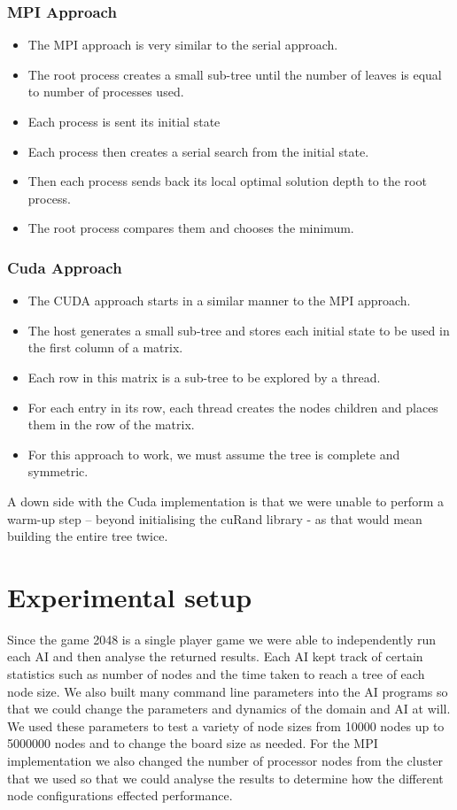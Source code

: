 \documentclass[11pt]{article}
\begin{document}
\begin{page}
\subsubsection{MPI Approach}
	\begin{itemize}
		\item The MPI approach is very similar to the serial approach.
		\item The root process creates a small sub-tree until the number of leaves is equal to number of processes used.
		\item Each process is sent its initial state
		\item Each process then creates a serial search from the initial state.
		\item Then each process sends back its local optimal solution depth to the root process.
		\item The root process compares them and chooses the minimum.
	\end{itemize}

\subsubsection{Cuda Approach}
	\begin{itemize}
		\item The CUDA approach starts in a similar manner to the MPI approach.
		\item The host generates a small sub-tree and stores each initial state to be used in the first column of a matrix.
		\item Each row in this matrix is a sub-tree to be explored by a thread.
		\item For each entry in its row, each thread creates the nodes children and places them in the row of the matrix.
		\item For this approach to work, we must assume the tree is complete and symmetric.
	\end{itemize}

A down side with the Cuda implementation is that we were unable to perform a warm-up step – beyond initialising the cuRand library - as that would mean building the entire tree twice.

\section{Experimental setup}
Since the game 2048 is a single player game we were able to independently run each AI and then analyse the returned results. Each AI kept track of certain statistics such as number of nodes and the time taken to reach a tree of each node size. We also built many command line parameters into the AI programs so that we could change the parameters and dynamics of the domain and AI at will. We used these parameters to test a variety of node sizes from 10000 nodes up to 5000000 nodes and to change the board size as needed. For the MPI implementation we also changed the number of processor nodes from the cluster that we used so that we could analyse the results to determine how the different node configurations effected performance. \\


\end{page}
\end{document}
